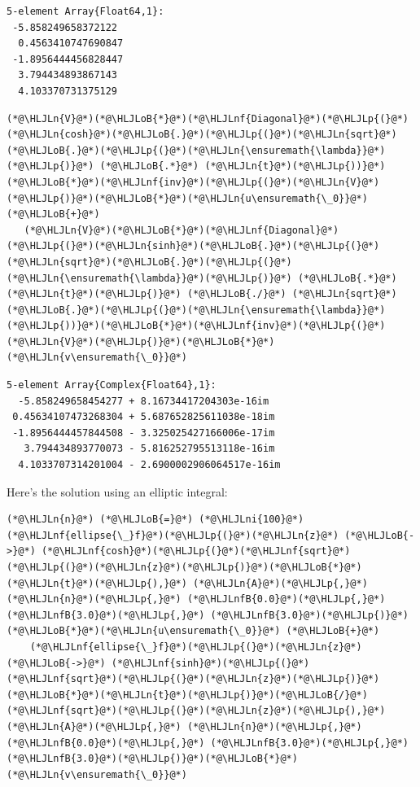 \documentclass[12pt,a4paper]{article}
\newcommand{\HLJLn}[1]{#1}
\newcommand{\HLJLnf}[1]{\textcolor[RGB]{66,102,213}{#1}}
\newcommand{\HLJLnfB}[1]{\textcolor[RGB]{59,151,46}{#1}}
\newcommand{\HLJLni}[1]{\textcolor[RGB]{59,151,46}{#1}}
\newcommand{\HLJLoB}[1]{\textcolor[RGB]{102,102,102}{\textbf{#1}}}
\newcommand{\HLJLp}[1]{#1}
\begin{document}
\begin{lstlisting}
5-element Array{Float64,1}:
 -5.858249658372122 
  0.4563410747690847
 -1.8956444456828447
  3.794434893867143 
  4.103370731375129
\end{lstlisting}


\begin{lstlisting}
(*@\HLJLn{V}@*)(*@\HLJLoB{*}@*)(*@\HLJLnf{Diagonal}@*)(*@\HLJLp{(}@*)(*@\HLJLn{cosh}@*)(*@\HLJLoB{.}@*)(*@\HLJLp{(}@*)(*@\HLJLn{sqrt}@*)(*@\HLJLoB{.}@*)(*@\HLJLp{(}@*)(*@\HLJLn{\ensuremath{\lambda}}@*)(*@\HLJLp{)}@*) (*@\HLJLoB{.*}@*) (*@\HLJLn{t}@*)(*@\HLJLp{))}@*)(*@\HLJLoB{*}@*)(*@\HLJLnf{inv}@*)(*@\HLJLp{(}@*)(*@\HLJLn{V}@*)(*@\HLJLp{)}@*)(*@\HLJLoB{*}@*)(*@\HLJLn{u\ensuremath{\_0}}@*) (*@\HLJLoB{+}@*) 
   (*@\HLJLn{V}@*)(*@\HLJLoB{*}@*)(*@\HLJLnf{Diagonal}@*)(*@\HLJLp{(}@*)(*@\HLJLn{sinh}@*)(*@\HLJLoB{.}@*)(*@\HLJLp{(}@*)(*@\HLJLn{sqrt}@*)(*@\HLJLoB{.}@*)(*@\HLJLp{(}@*)(*@\HLJLn{\ensuremath{\lambda}}@*)(*@\HLJLp{)}@*) (*@\HLJLoB{.*}@*) (*@\HLJLn{t}@*)(*@\HLJLp{)}@*) (*@\HLJLoB{./}@*) (*@\HLJLn{sqrt}@*)(*@\HLJLoB{.}@*)(*@\HLJLp{(}@*)(*@\HLJLn{\ensuremath{\lambda}}@*)(*@\HLJLp{))}@*)(*@\HLJLoB{*}@*)(*@\HLJLnf{inv}@*)(*@\HLJLp{(}@*)(*@\HLJLn{V}@*)(*@\HLJLp{)}@*)(*@\HLJLoB{*}@*)(*@\HLJLn{v\ensuremath{\_0}}@*)
\end{lstlisting}

\begin{lstlisting}
5-element Array{Complex{Float64},1}:
  -5.858249658454277 + 8.16734417204303e-16im  
 0.45634107473268304 + 5.687652825611038e-18im 
 -1.8956444457844508 - 3.325025427166006e-17im 
   3.794434893770073 - 5.816252795513118e-16im 
  4.1033707314201004 - 2.6900002906064517e-16im
\end{lstlisting}


Here's the solution using an elliptic integral:


\begin{lstlisting}
(*@\HLJLn{n}@*) (*@\HLJLoB{=}@*) (*@\HLJLni{100}@*)
(*@\HLJLnf{ellipse{\_}f}@*)(*@\HLJLp{(}@*)(*@\HLJLn{z}@*) (*@\HLJLoB{->}@*) (*@\HLJLnf{cosh}@*)(*@\HLJLp{(}@*)(*@\HLJLnf{sqrt}@*)(*@\HLJLp{(}@*)(*@\HLJLn{z}@*)(*@\HLJLp{)}@*)(*@\HLJLoB{*}@*)(*@\HLJLn{t}@*)(*@\HLJLp{),}@*) (*@\HLJLn{A}@*)(*@\HLJLp{,}@*) (*@\HLJLn{n}@*)(*@\HLJLp{,}@*) (*@\HLJLnfB{0.0}@*)(*@\HLJLp{,}@*) (*@\HLJLnfB{3.0}@*)(*@\HLJLp{,}@*) (*@\HLJLnfB{3.0}@*)(*@\HLJLp{)}@*)(*@\HLJLoB{*}@*)(*@\HLJLn{u\ensuremath{\_0}}@*) (*@\HLJLoB{+}@*)
    (*@\HLJLnf{ellipse{\_}f}@*)(*@\HLJLp{(}@*)(*@\HLJLn{z}@*) (*@\HLJLoB{->}@*) (*@\HLJLnf{sinh}@*)(*@\HLJLp{(}@*)(*@\HLJLnf{sqrt}@*)(*@\HLJLp{(}@*)(*@\HLJLn{z}@*)(*@\HLJLp{)}@*)(*@\HLJLoB{*}@*)(*@\HLJLn{t}@*)(*@\HLJLp{)}@*)(*@\HLJLoB{/}@*)(*@\HLJLnf{sqrt}@*)(*@\HLJLp{(}@*)(*@\HLJLn{z}@*)(*@\HLJLp{),}@*) (*@\HLJLn{A}@*)(*@\HLJLp{,}@*) (*@\HLJLn{n}@*)(*@\HLJLp{,}@*) (*@\HLJLnfB{0.0}@*)(*@\HLJLp{,}@*) (*@\HLJLnfB{3.0}@*)(*@\HLJLp{,}@*) (*@\HLJLnfB{3.0}@*)(*@\HLJLp{)}@*)(*@\HLJLoB{*}@*)(*@\HLJLn{v\ensuremath{\_0}}@*)
\end{lstlisting}
\end{document}
